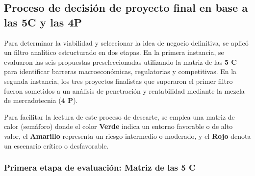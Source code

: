 \newpage

\subsection{Proceso de decisión de proyecto final en base a las 5C y las 4P}

Para determinar la viabilidad y seleccionar la idea de negocio definitiva, se aplicó un filtro analítico estructurado en dos etapas. En la primera instancia, se evaluaron las seis propuestas preseleccionadas utilizando la matriz de las \textbf{5 C} para identificar barreras macroeconómicas, regulatorias y competitivas. En la segunda instancia, los tres proyectos finalistas que superaron el primer filtro fueron sometidos a un análisis de penetración y rentabilidad mediante la mezcla de mercadotecnia (\textbf{4 P}).

Para facilitar la lectura de este proceso de descarte, se emplea una matriz de calor (semáforo) donde el color \textbf{\colorbox{green!50}{Verde}} indica un entorno favorable o de alto valor, el \textbf{\colorbox{yellow!50}{Amarillo}} representa un riesgo intermedio o moderado, y el \textbf{\colorbox{red!50}{Rojo}} denota un escenario crítico o desfavorable.

\subsubsection{Primera etapa de evaluación: Matriz de las 5 C}

